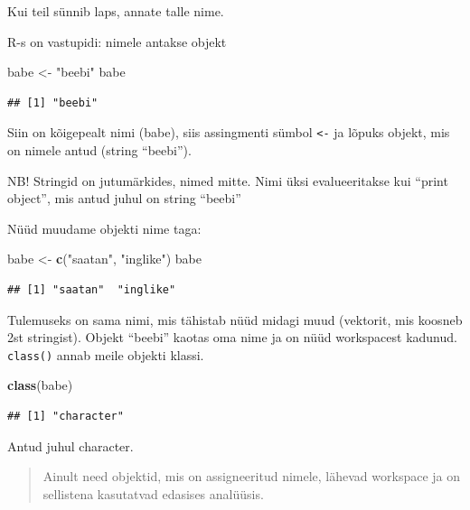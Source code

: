 \documentclass[]{book}
\newenvironment{Shaded}{\begin{snugshade}}{\end{snugshade}}
\newcommand{\KeywordTok}[1]{\textcolor[rgb]{0.13,0.29,0.53}{\textbf{#1}}}
\newcommand{\StringTok}[1]{\textcolor[rgb]{0.31,0.60,0.02}{#1}}
\newcommand{\NormalTok}[1]{#1}
\begin{document}
Kui teil sünnib laps, annate talle nime.

R-s on vastupidi: nimele antakse objekt

\begin{Shaded}
\begin{Highlighting}[]
\NormalTok{babe <-}\StringTok{ "beebi"}
\NormalTok{babe}
\end{Highlighting}
\end{Shaded}

\begin{verbatim}
## [1] "beebi"
\end{verbatim}

Siin on kõigepealt nimi (babe), siis assingmenti sümbol
\texttt{\textless{}-} ja lõpuks objekt, mis on nimele antud (string
``beebi'').

NB! Stringid on jutumärkides, nimed mitte. Nimi üksi evalueeritakse kui
``print object'', mis antud juhul on string ``beebi''

Nüüd muudame objekti nime taga:

\begin{Shaded}
\begin{Highlighting}[]
\NormalTok{babe <-}\StringTok{ }\KeywordTok{c}\NormalTok{(}\StringTok{"saatan"}\NormalTok{, }\StringTok{"inglike"}\NormalTok{)}
\NormalTok{babe}
\end{Highlighting}
\end{Shaded}

\begin{verbatim}
## [1] "saatan"  "inglike"
\end{verbatim}

Tulemuseks on sama nimi, mis tähistab nüüd midagi muud (vektorit, mis
koosneb 2st stringist). Objekt ``beebi'' kaotas oma nime ja on nüüd
workspacest kadunud. \texttt{class()} annab meile objekti klassi.

\begin{Shaded}
\begin{Highlighting}[]
\KeywordTok{class}\NormalTok{(babe)}
\end{Highlighting}
\end{Shaded}

\begin{verbatim}
## [1] "character"
\end{verbatim}

Antud juhul character.

\begin{quote}
Ainult need objektid, mis on assigneeritud nimele, lähevad workspace ja
on sellistena kasutatvad edasises analüüsis.
\end{quote}
\end{document}
